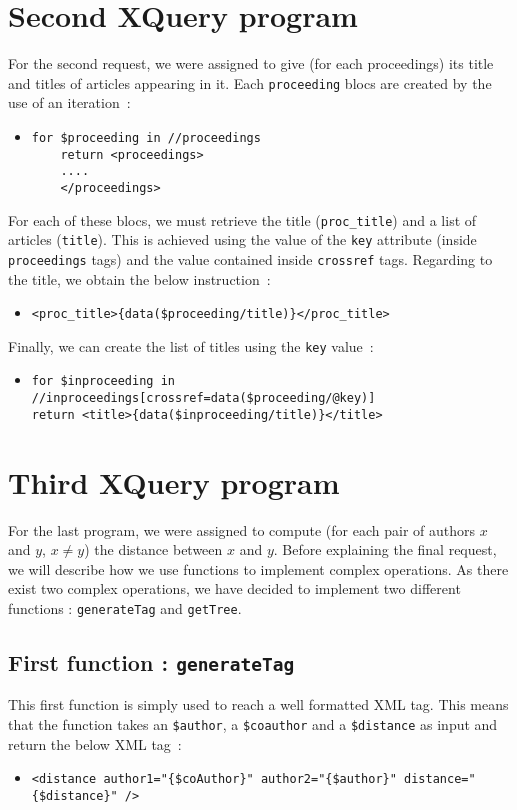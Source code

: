 \documentclass{article}
\begin{document}
\section{Second XQuery program}
For the second request, we were assigned to give (for each proceedings) its title and titles of articles appearing in it. Each \verb|proceeding| blocs are created by the use of an iteration~:
  \begin{itemize}
  \item \begin{verbatim}
for $proceeding in //proceedings
    return <proceedings>
    ....
    </proceedings>
  \end{verbatim}
  \end{itemize}
For each of these blocs, we must retrieve the title (\verb|proc_title|) and a list of articles (\verb|title|). This is achieved using the value of the \verb|key| attribute (inside \verb|proceedings| tags) and the value contained inside \verb|crossref| tags. Regarding to the title, we obtain the below instruction~:
  \begin{itemize}
    \item \verb|<proc_title>{data($proceeding/title)}</proc_title>|
  \end{itemize}
Finally, we can create the list of titles using the \verb|key| value~:  
  \begin{itemize}
    \item \begin{verbatim}
for $inproceeding in //inproceedings[crossref=data($proceeding/@key)]
return <title>{data($inproceeding/title)}</title>\end{verbatim}
  \end{itemize}
  

\section{Third XQuery program}
For the last program, we were assigned to compute (for each pair of authors $x$ and $y$, $x \neq y$) the distance between $x$ and $y$. Before explaining the final request, we will describe how we use functions to implement complex operations. As there exist two complex operations, we have decided to implement two different functions : \verb|generateTag| and \verb|getTree|.

\subsection{First function : \texttt{generateTag}}
This first function is simply used to reach a well formatted XML tag. This means that the function takes an \verb|$author|, a \verb|$coauthor| and a \verb|$distance| as input and return the below XML tag~:
\begin{itemize}
\item \verb|<distance author1="{$coAuthor}" author2="{$author}" distance="{$distance}" />|
\end{itemize}
\end{document}
